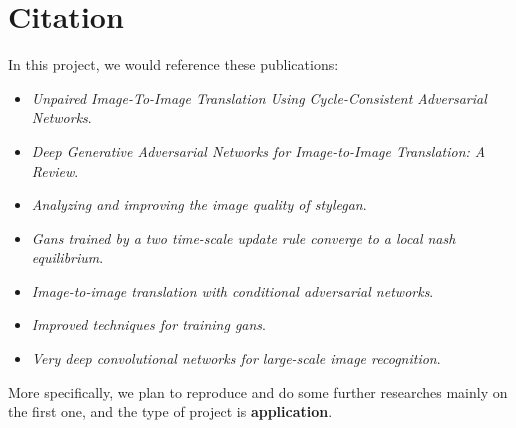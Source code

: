 \section{Citation}

In this project, we would reference these publications:
\begin{itemize}
    \item \textit{Unpaired Image-To-Image Translation Using Cycle-Consistent Adversarial Networks}\cite{zhu_unpaired_2017}.
    \item \textit{Deep Generative Adversarial Networks for Image-to-Image Translation: A Review}\cite{sym12101705}.
    \item \textit{Analyzing and improving the image quality of stylegan}\cite{karras2020analyzing}.
    \item \textit{Gans trained by a two time-scale update rule converge to a local nash equilibrium}\cite{heusel2017gans}.
    \item \textit{Image-to-image translation with conditional adversarial networks}\cite{isola2017image}.
    \item \textit{Improved techniques for training gans}\cite{salimans2016improved}.
    \item \textit{Very deep convolutional networks for large-scale image recognition}\cite{simonyan2014very}.
\end{itemize}

More specifically, we plan to reproduce and
do some further researches mainly on the first one,
and the type of project is \textbf{application}.
